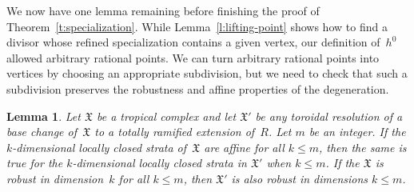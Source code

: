 \documentclass[11pt]{amsart}
\newtheorem{lem}[thm]{Lemma}
\theoremstyle{definition}
\newcommand{\X}{\mathfrak X}
\begin{document}
We now have one lemma remaining before finishing the proof of
Theorem~\ref{t:specialization}. While
Lemma~\ref{l:lifting-point} shows how to find a divisor whose refined
specialization contains a given vertex, our definition of~$h^0$ allowed
arbitrary rational points. We can turn arbitrary rational points into vertices
by choosing an appropriate subdivision, but we need to check that such a
subdivision preserves the robustness and affine properties of the
degeneration.

\begin{lem}\label{l:subdivision-refined}
Let $\X$ be a tropical complex and let $\X'$ be any toroidal resolution of a
base change of~$\X$ to a totally ramified extension of~$R$.
Let $m$ be an integer. If the $k$-dimensional
locally closed strata of~$\X$ are affine for all $k \leq m$,
then the same is true
for the $k$-dimensional locally closed strata in $\X'$ when $k \leq m$.
If the $\X$ is robust in dimension~$k$ for all $k \leq m$,
then $\X'$ is also robust in dimensions $k \leq m$.
\end{lem}
\end{document}
